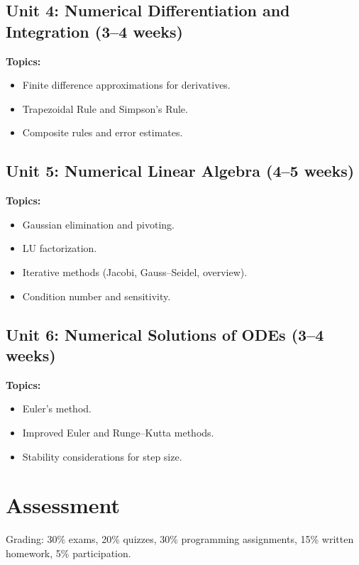 \documentclass[12pt,oneside]{book}
\begin{document}
\subsection{Unit 4: Numerical Differentiation and Integration (3--4 weeks)}

\textbf{Topics:}
\begin{itemize}
    \item Finite difference approximations for derivatives.
    \item Trapezoidal Rule and Simpson’s Rule.
    \item Composite rules and error estimates.
\end{itemize}

\subsection{Unit 5: Numerical Linear Algebra (4--5 weeks)}

\textbf{Topics:}
\begin{itemize}
    \item Gaussian elimination and pivoting.
    \item LU factorization.
    \item Iterative methods (Jacobi, Gauss–Seidel, overview).
    \item Condition number and sensitivity.
\end{itemize}

\subsection{Unit 6: Numerical Solutions of ODEs (3--4 weeks)}

\textbf{Topics:}
\begin{itemize}
    \item Euler’s method.
    \item Improved Euler and Runge–Kutta methods.
    \item Stability considerations for step size.
\end{itemize}

\section{Assessment}

Grading: 30\% exams, 20\% quizzes, 30\% programming assignments, 15\% written homework, 5\% participation.

\end{document}
